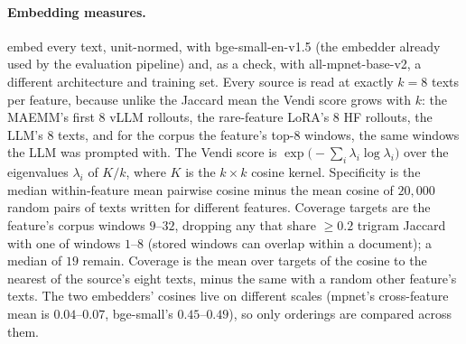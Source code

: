 \paragraph{Embedding measures.}  embed every text, unit-normed,
with bge-small-en-v1.5 (the embedder already used by the evaluation pipeline) and, as a check, with
all-mpnet-base-v2, a different architecture and training set. Every source is read at exactly $k=8$
texts per feature, because unlike the Jaccard mean the Vendi score grows with $k$: the MAEMM's
first $8$ vLLM rollouts, the rare-feature LoRA's $8$ HF rollouts, the LLM's $8$ texts, and for the
corpus the feature's top-8 windows, the same windows the LLM was prompted with. The Vendi score is
$\exp\bigl(-\sum_i \lambda_i \log \lambda_i\bigr)$ over the eigenvalues $\lambda_i$ of $K/k$, where
$K$ is the $k \times k$ cosine kernel. Specificity is the median within-feature mean pairwise cosine
minus the mean cosine of $20{,}000$ random pairs of texts written for different features. Coverage
targets are the feature's corpus windows $9$--$32$, dropping any that share $\geq 0.2$ trigram
Jaccard with one of windows $1$--$8$ (stored windows can overlap within a document); a median of
$19$ remain. Coverage is the mean over targets of the cosine to the nearest of the source's eight
texts, minus the same with a random other feature's texts. The two embedders' cosines live on
different scales (mpnet's cross-feature mean is $0.04$--$0.07$, bge-small's $0.45$--$0.49$), so only
orderings are compared across them.

